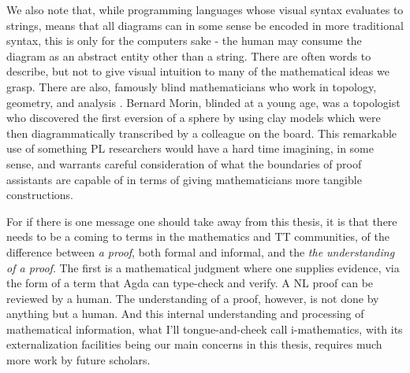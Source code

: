 We also note that, while programming languages whose visual syntax evaluates to
strings, means that all diagrams can in some sense be encoded in more
traditional syntax, this is only for the computers sake - the human may consume
the diagram as an abstract entity other than a string. There are often words to
describe, but not to give visual intuition to many of the mathematical ideas we
grasp. There are also, famously blind mathematicians who work in topology,
geometry, and analysis \cite{2002TheWO}. Bernard Morin, blinded at a young age,
was a topologist who discovered the first eversion of a sphere by using clay
models which were then diagrammatically transcribed by a colleague on the board.
This remarkable use of something PL researchers would have a hard time
imagining, in some sense, and warrants careful consideration of what the
boundaries of proof assistants are capable of in terms of giving mathematicians
more tangible constructions.

For if there is one message one should take away from this thesis, it is that
there needs to be a coming to terms in the mathematics and TT communities, of
the difference between \emph{a proof}, both formal and informal, and the
\emph{the understanding of a proof}. The first is a mathematical judgment where
one supplies evidence, via the form of a term that Agda can type-check and
verify. A NL proof can be reviewed by a human. The understanding of a proof,
however, is not done by anything but a human. And this internal understanding
and processing of mathematical information, what I'll tongue-and-cheek call
i-mathematics, with its externalization facilities being our main concerns in
this thesis, requires much more work by future scholars.
